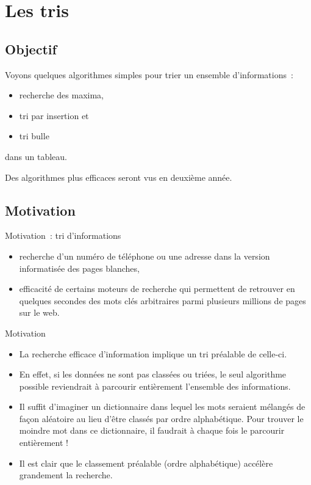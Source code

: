 \section{Les tris}

\subsection{Objectif}

\begin{frame}
	Voyons quelques algorithmes simples pour trier un
	ensemble d'informations~: 
	
	\begin{itemize}
		\item
		recherche des maxima, 
		\item
		tri	par insertion et 
		\item
		tri bulle 
	\end{itemize}
	dans un tableau. 
	
	\bigskip
	
	Des algorithmes plus efficaces seront vus
	en deuxième année.
\end{frame}

\subsection{Motivation}

\begin{frame}{Motivation~: tri d'informations}
	\begin{itemize}
		\item
		recherche d’un numéro de téléphone ou une adresse
		dans la version informatisée des pages blanches, 
		\item
		efficacité de certains moteurs de recherche qui
		permettent de retrouver en quelques secondes des mots clés arbitraires
		parmi plusieurs millions de pages sur le web.
	\end{itemize}
\end{frame}

\begin{frame}{Motivation}
	\begin{itemize}
		\item
		La recherche efficace d’information implique un tri préalable de
		celle-ci. 
		\item
		En effet, si les données ne sont pas classées ou triées, le
		seul algorithme possible reviendrait à parcourir entièrement l’ensemble
		des informations. 
		\item
		Il suffit d’imaginer un dictionnaire
		dans lequel les mots seraient mélangés de façon aléatoire au lieu
		d’être classés par ordre alphabétique. Pour trouver le moindre mot dans
		ce dictionnaire, il faudrait à chaque fois le parcourir entièrement !
		\item
		Il est clair que le classement préalable (ordre alphabétique) accélère
		grandement la recherche.
	\end{itemize}
\end{frame}

